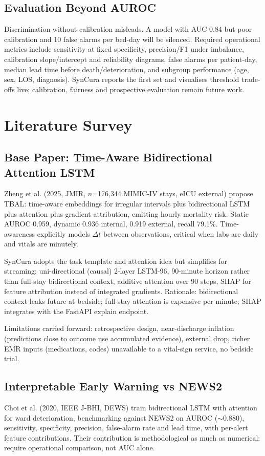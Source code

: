 \documentclass[a4paper,conference]{IEEEtran}
\begin{document}
\subsection{Evaluation Beyond AUROC}
Discrimination without calibration misleads. A model with AUC 0.84 but poor calibration and 10 false alarms per bed-day will be silenced. Required operational metrics include sensitivity at fixed specificity, precision/F1 under imbalance, calibration slope/intercept and reliability diagrams, false alarms per patient-day, median lead time before death/deterioration, and subgroup performance (age, sex, LOS, diagnosis). SynCura reports the first set and visualises threshold trade-offs live; calibration, fairness and prospective evaluation remain future work.

\section{Literature Survey}
\subsection{Base Paper: Time-Aware Bidirectional Attention LSTM}
Zheng et al. (2025, JMIR, $n$=176,344 MIMIC-IV stays, eICU external) propose TBAL: time-aware embeddings for irregular intervals plus bidirectional LSTM plus attention plus gradient attribution, emitting hourly mortality risk. Static AUROC 0.959, dynamic 0.936 internal, 0.919 external, recall 79.1\%. Time-awareness explicitly models $\Delta t$ between observations, critical when labs are daily and vitals are minutely.

SynCura adopts the task template and attention idea but simplifies for streaming: uni-directional (causal) 2-layer LSTM-96, 90-minute horizon rather than full-stay bidirectional context, additive attention over 90 steps, SHAP for feature attribution instead of integrated gradients. Rationale: bidirectional context leaks future at bedside; full-stay attention is expensive per minute; SHAP integrates with the FastAPI explain endpoint.

Limitations carried forward: retrospective design, near-discharge inflation (predictions close to outcome use accumulated evidence), external drop, richer EMR inputs (medications, codes) unavailable to a vital-sign service, no bedside trial.

\subsection{Interpretable Early Warning vs NEWS2}
Choi et al. (2020, IEEE J-BHI, DEWS) train bidirectional LSTM with attention for ward deterioration, benchmarking against NEWS2 on AUROC ($\sim$0.880), sensitivity, specificity, precision, false-alarm rate and lead time, with per-alert feature contributions. Their contribution is methodological as much as numerical: require operational comparison, not AUC alone.
\end{document}
